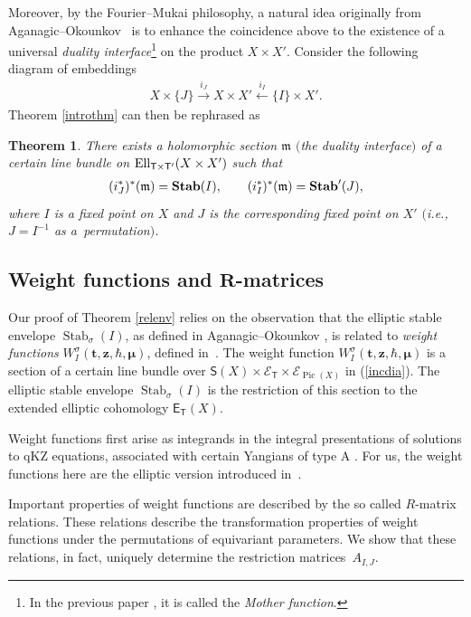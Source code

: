 \documentclass[pdftex]{sigma}
\DeclareMathOperator\Stab{Stab}
\newcommand{\bT}{\mathsf{T}}
\newcommand{\sE}{\mathscr{E}}
\DeclareMathOperator\Pic{Pic}
\def\ttt{{\boldsymbol t}}
\def\zz{{\boldsymbol z}}
\def\mub{{\boldsymbol\mu}}
\numberwithin{equation}{section}
\newtheorem{Theorem}{Theorem}[section]
\begin{document}
Moreover, by the Fourier--Mukai philosophy, a natural idea originally from Aganagic--Okoun\-kov~\cite{AOelliptic} is to enhance the coincidence above to the existence of a universal \emph{duality interface}\footnote{In the previous paper \cite{RVSZ}, it is called the \emph{Mother function}. } on the product $X \times X'$. Consider the following diagram of embeddings
\begin{gather*}
X\times \{ J \} \stackrel{i_{J}}{\longrightarrow} X\times X' \stackrel{i_{I}}{\longleftarrow} \{I\}\times X'.
\end{gather*}
Theorem \ref{introthm} can then be rephrased as
\begin{Theorem}
 There exists a holomorphic section ${\mathfrak{m}}$ $($the duality interface$)$ of a certain line bundle on ${\rm Ell}_{\bT\times\bT'}(X\times X')$ such that
 \begin{gather*}
 (i^{*}_{J})^*({\mathfrak{m}})= {\bf Stab}(I), \qquad (i^{*}_{I})^*({\mathfrak{m}})= {\bf Stab}' (J),
 \end{gather*}
 where $I$ is a fixed point on $X$ and $J$ is the corresponding fixed point on $X'$ $($i.e., $J=I^{-1}$ as a~permutation$)$.
\end{Theorem}

\subsection[Weight functions and $R$-matrices]{Weight functions and $\boldsymbol{R}$-matrices}

Our proof of Theorem \ref{relenv} relies on the observation that the elliptic stable envelope $\Stab_\sigma (I)$, as defined in Aganagic--Okounkov \cite{AOelliptic}, is related to \emph{weight functions} $W^{\sigma}_I (\ttt, \zz, \hbar, \mub)$, defined in~\cite{RTV}. The weight function $W^{\sigma}_I (\ttt, \zz, \hbar, \mub)$ is a section of a certain line bundle over $\mathsf{S}(X) \times \sE_\bT \times \sE_{\Pic(X)}$ in (\ref{incdia}). The elliptic stable envelope $\Stab_\sigma (I)$ is the restriction of this section to
the extended elliptic cohomology $\textsf{E}_\bT(X)$.

Weight functions first arise as integrands in the integral presentations of solutions to qKZ equations, associated with certain Yangians of type A \cite{FTV, FTV2,TV4, TV5, TV6, TV7, Var}. For us, the weight functions here are the elliptic version introduced in~\cite{RTV}.

Important properties of weight functions are described by the so called $R$-matrix relations. These relations describe the transformation properties of weight functions under the permutations of equivariant parameters. We show that these relations, in fact, uniquely determine the restriction matrices~$A_{I,J}$.
\end{document}
